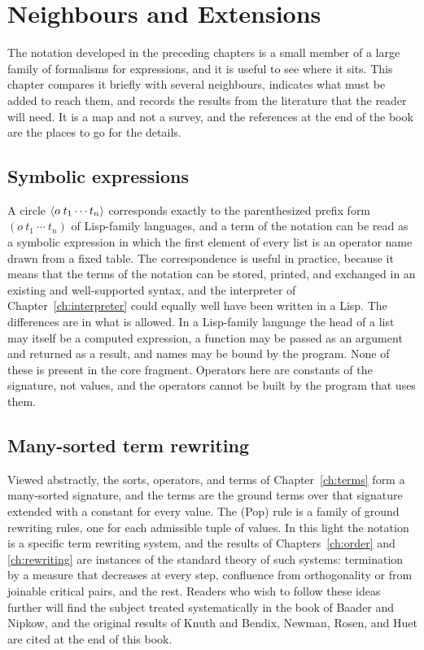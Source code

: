 \chapter{Neighbours and Extensions}
\label{ch:comparisons}

The notation developed in the preceding chapters is a small member of a large family of formalisms for expressions, and it is useful to see where it sits. This chapter compares it briefly with several neighbours, indicates what must be added to reach them, and records the results from the literature that the reader will need. It is a map and not a survey, and the references at the end of the book are the places to go for the details.

\section{Symbolic expressions}

A circle $\langle o\; t_1\cdots t_n\rangle$ corresponds exactly to the parenthesized prefix form $(o\ t_1\ \cdots\ t_n)$ of Lisp-family languages, and a term of the notation can be read as a symbolic expression in which the first element of every list is an operator name drawn from a fixed table. The correspondence is useful in practice, because it means that the terms of the notation can be stored, printed, and exchanged in an existing and well-supported syntax, and the interpreter of Chapter~\ref{ch:interpreter} could equally well have been written in a Lisp. The differences are in what is allowed. In a Lisp-family language the head of a list may itself be a computed expression, a function may be passed as an argument and returned as a result, and names may be bound by the program. None of these is present in the core fragment. Operators here are constants of the signature, not values, and the operators cannot be built by the program that uses them.

\section{Many-sorted term rewriting}

Viewed abstractly, the sorts, operators, and terms of Chapter~\ref{ch:terms} form a many-sorted signature, and the terms are the ground terms over that signature extended with a constant for every value. The (Pop) rule is a family of ground rewriting rules, one for each admissible tuple of values. In this light the notation is a specific term rewriting system, and the results of Chapters~\ref{ch:order} and \ref{ch:rewriting} are instances of the standard theory of such systems: termination by a measure that decreases at every step, confluence from orthogonality or from joinable critical pairs, and the rest. Readers who wish to follow these ideas further will find the subject treated systematically in the book of Baader and Nipkow, and the original results of Knuth and Bendix, Newman, Rosen, and Huet are cited at the end of this book.

